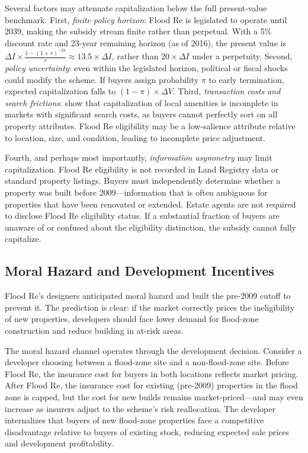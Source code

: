 \documentclass[12pt]{article}
\begin{document}
Several factors may attenuate capitalization below the full present-value benchmark. First, \textit{finite policy horizon}: Flood Re is legislated to operate until 2039, making the subsidy stream finite rather than perpetual. With a 5\% discount rate and 23-year remaining horizon (as of 2016), the present value is $\Delta I \times \frac{1 - (1+r)^{-23}}{r} \approx 13.5 \times \Delta I$, rather than $20 \times \Delta I$ under a perpetuity. Second, \textit{policy uncertainty}: even within the legislated horizon, political or fiscal shocks could modify the scheme. If buyers assign probability $\pi$ to early termination, expected capitalization falls to $(1-\pi) \times \Delta V$. Third, \textit{transaction costs and search frictions}: \citet{harding2003estimating} show that capitalization of local amenities is incomplete in markets with significant search costs, as buyers cannot perfectly sort on all property attributes. Flood Re eligibility may be a low-salience attribute relative to location, size, and condition, leading to incomplete price adjustment.

Fourth, and perhaps most importantly, \textit{information asymmetry} may limit capitalization. Flood Re eligibility is not recorded in Land Registry data or standard property listings. Buyers must independently determine whether a property was built before 2009---information that is often ambiguous for properties that have been renovated or extended. Estate agents are not required to disclose Flood Re eligibility status. If a substantial fraction of buyers are unaware of or confused about the eligibility distinction, the subsidy cannot fully capitalize.

\subsection{Moral Hazard and Development Incentives}

Flood Re's designers anticipated moral hazard and built the pre-2009 cutoff to prevent it. The prediction is clear: if the market correctly prices the ineligibility of new properties, developers should face lower demand for flood-zone construction and reduce building in at-risk areas.

The moral hazard channel operates through the development decision. Consider a developer choosing between a flood-zone site and a non-flood-zone site. Before Flood Re, the insurance cost for buyers in both locations reflects market pricing. After Flood Re, the insurance cost for existing (pre-2009) properties in the flood zone is capped, but the cost for new builds remains market-priced---and may even increase as insurers adjust to the scheme's risk reallocation. The developer internalizes that buyers of new flood-zone properties face a competitive disadvantage relative to buyers of existing stock, reducing expected sale prices and development profitability.
\end{document}
